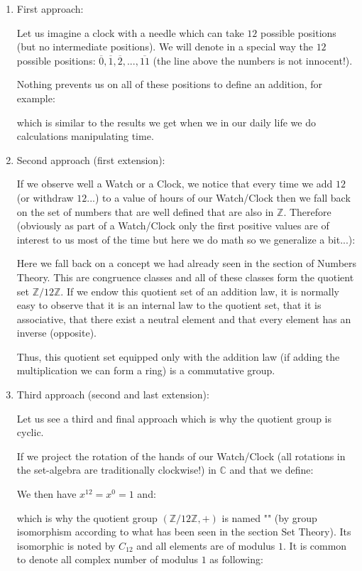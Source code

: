 	\begin{enumerate}
		\item First approach:
		
		Let us imagine a clock with a needle which can take $12$ possible positions (but no intermediate positions). We will denote in a special way the $12$ possible positions: $\overline{0},\overline{1},\overline{2},...,\overline{11}$  (the line above the numbers is not innocent!).
		
		Nothing prevents us on all of these positions to define an addition, for example:
		
	  	which is similar to the results we get when we in our daily life we do calculations manipulating time.
	  	
	  	\item Second approach (first extension):
	  	
	  	If we observe well a Watch or a Clock, we notice that every time we add $12$ (or withdraw $12$...) to a value of hours of our Watch/Clock then we fall back on the set of numbers that are well defined that are also in $\mathbb{Z}$. Therefore (obviously as part of a Watch/Clock only the first positive values are of interest to us most of the time but here we do math so we generalize a bit...):
	  	
		Here we fall back on a concept we had already seen in the section of Numbers Theory. This are congruence classes and all of these classes form the quotient set $\mathbb{Z}/12\mathbb{Z}$. If we endow this quotient set of an addition law, it is normally easy to observe that it is an internal law to the quotient set, that it is associative, that there exist a neutral element and that every element has an inverse (opposite).
		
		Thus, this quotient set equipped only with the addition law (if adding the multiplication we can form a ring) is a commutative group.

		\item Third approach (second and last extension):
		
		Let us see a third and final approach which is why the quotient group is cyclic.
		
		If we project the rotation of the hands of our Watch/Clock (all rotations in the set-algebra are traditionally clockwise!) in $\mathbb{C}$ and that we define:
		
		We then have $x^{12}=x^0=1$ and:
		
		which is why the quotient group $(\mathbb{Z}/12\mathbb{Z},+)$ is named "" (by group isomorphism according to what has been seen in the section Set Theory). Its isomorphic is noted by $C_{12}$ and all elements are of modulus $1$. It is common to denote all complex number of modulus $1$ as following:
		

\end{enumerate}
